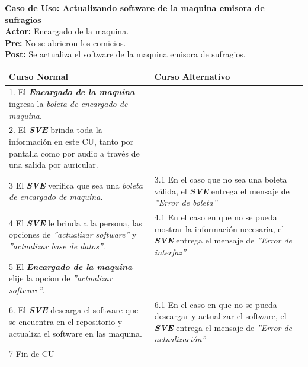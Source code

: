 \documentclass[spanish, 10pt,a4paper]{article}
\numberwithin{equation}{section} %
\begin{document}
\noindent\textbf{Caso de Uso: Actualizando software de la maquina emisora de sufragios}\\
\textbf{Actor: } Encargado de la maquina.\\
\textbf{Pre: } No se abrieron los comicios.\\
\textbf{Post: } Se actualiza el software de la maquina emisora de sufragios.\\
\begin{table}[H]
  \centering
\bgroup
\def\arraystretch{1.3}
  \begin{tabular}{p{9cm} | p{7cm}}
    \hline
    Curso Normal & Curso Alternativo \\
    \hline
    \hline    
    1. El \textbf{\textit{Encargado de la maquina}} ingresa la \textit{boleta de encargado de maquina}. 
    & \\
    
    \hline
    2. El \textbf{\textit{SVE}} brinda toda la información en este CU, tanto por pantalla como por audio a través de una salida por auricular.
    &
    \\
    
    \hline
    3 El \textbf{\textit{SVE}} verifica que sea una \textit{boleta de encargado de maquina}.
    & 
    3.1 En el caso que no sea una boleta válida, el \textbf{\textit{SVE}} entrega el mensaje de \textit{''Error de boleta''}
    \\
    
    \hline
    4 El \textbf{\textit{SVE}} le brinda a la persona, las opciones de \textit{''actualizar software''} y \textit{''actualizar base de datos''}.
    & 
    4.1 En el caso en que no se pueda mostrar la información necesaria, el \textbf{\textit{SVE}} entrega el mensaje de \textit{''Error de interfaz''}
    \\
    
    \hline
    5 El \textbf{\textit{Encargado de la maquina}} elije la opcion de \textit{''actualizar software''}.
    & \\
    
    \hline
    6. El \textbf{\textit{SVE}} descarga el software que se encuentra en el repositorio y actualiza el software en las maquina.
    &
    6.1 En el caso en que no se pueda descargar y actualizar el software, el \textbf{\textit{SVE}} entrega el mensaje de \textit{''Error de actualización''}
    \\
    
    \hline
    7 Fin de CU
    & \\
    \hline
  \end{tabular}
\egroup
\end{table}
\end{document}

